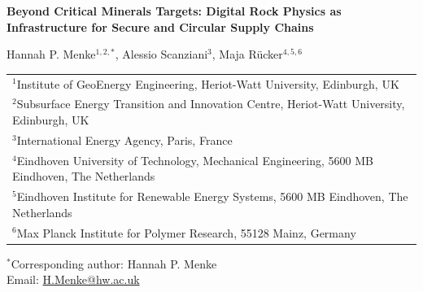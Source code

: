 \documentclass[12pt,a4paper]{article}
\begin{document}
\begin{center}
{\Large\bfseries Beyond Critical Minerals Targets: Digital Rock Physics as Infrastructure for Secure and Circular Supply Chains\par}

\vspace{2em}

Hannah P. Menke$^{1,2,*}$, Alessio Scanziani$^{3}$, Maja R\"ucker$^{4,5,6}$

\vspace{1.5em}

\begin{tabular}{p{}}
$^{1}$Institute of GeoEnergy Engineering, Heriot-Watt University, Edinburgh, UK\\[0.4em]
$^{2}$Subsurface Energy Transition and Innovation Centre, Heriot-Watt University, Edinburgh, UK\\[0.4em]
$^{3}$International Energy Agency, Paris, France\\[0.4em]
$^{4}$Eindhoven University of Technology, Mechanical Engineering, 5600 MB Eindhoven, The Netherlands\\[0.4em]
$^{5}$Eindhoven Institute for Renewable Energy Systems, 5600 MB Eindhoven, The Netherlands\\[0.4em]
$^{6}$Max Planck Institute for Polymer Research, 55128 Mainz, Germany
\end{tabular}

\vspace{2em}

$^{*}$Corresponding author: Hannah P. Menke\\
Email: \href{mailto:H.Menke@hw.ac.uk}{H.Menke@hw.ac.uk}
\end{center}
\end{document}

